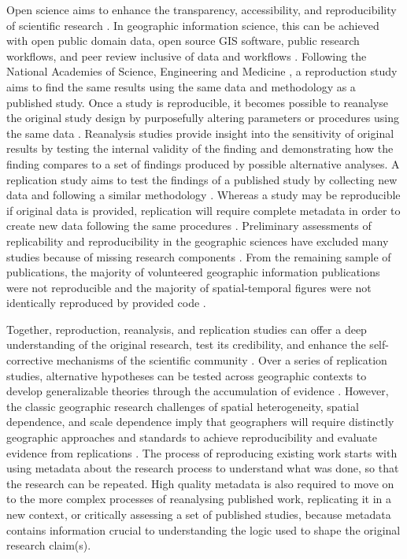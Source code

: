 \documentclass{isprs} %
\begin{document}
Open science aims to enhance the transparency, accessibility, and reproducibility of scientific research \citep{NASEM2018}.
In geographic information science, this can be achieved with open public domain data, open source GIS software, public research workflows, and peer review inclusive of data and workflows \citep{Singleton2016}. 
Following the National Academies of Science, Engineering and Medicine \citep{NASEM2019}, a reproduction study aims to find the same results using the same data and methodology as a published study.
Once a study is reproducible, it becomes possible to reanalyse the original study design by purposefully altering parameters or procedures using the same data \citep{Christensen2019}. 
Reanalysis studies provide insight into the sensitivity of original results by testing the internal validity of the finding and  demonstrating how the finding compares to a set of findings produced by possible alternative analyses. 
A replication study aims to test the findings of a published study by collecting new data and following a similar methodology \citep{NASEM2019}.
Whereas a study may be reproducible if original data is provided, replication will require complete metadata in order to create new data following the same procedures \citep{Ostermann2017}.
Preliminary assessments of replicability and reproducibility in the geographic sciences have excluded many studies because of missing research components \citep{Ostermann2017,Konkol2019}.
From the remaining sample of publications, the majority of volunteered geographic information publications were not reproducible \citep{Ostermann2017} and the majority of spatial-temporal figures were not identically reproduced by provided code \citep{Konkol2019}.

Together, reproduction, reanalysis, and replication studies can offer a deep understanding of the original research, test its credibility, and enhance the self-corrective mechanisms of the scientific community \citep{Christensen2019,NASEM2019}.
Over a series of replication studies, alternative hypotheses can be tested across geographic contexts to develop generalizable theories through the accumulation of evidence \citep{Kedron2022}.
However, the classic geographic research challenges of spatial heterogeneity, spatial dependence, and scale dependence imply that geographers will require distinctly geographic approaches and standards to achieve reproducibility \citep{Kedron2021,Brunsdon2020} and evaluate evidence from replications \citep{Kedron2022}.
The process of reproducing existing work starts with using metadata about the research process to understand what was done, so that the research can be repeated. 
High quality metadata is also required to move on to the more complex processes of reanalysing published work, replicating it in a new context, or critically assessing a set of published studies, because metadata contains information crucial to understanding the logic used to shape the original research claim(s).
\end{document}
